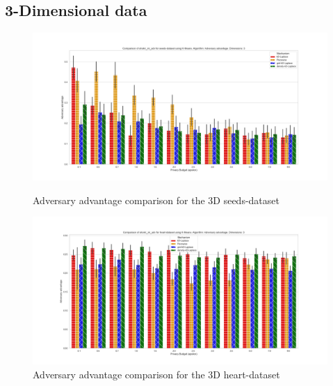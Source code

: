 {\begin{figure}[H]
    \end{figure}
    \subsection{3-Dimensional data}
    \begin{figure}[H]
        \centering
        \begin{minipage}[c]{0.8\textwidth}
            \includegraphics[width=1\textwidth]{Results/RQ2/seeds-dataset/shokri_mi_adv_seeds-dataset_comparison.png}
            \caption{Adversary advantage comparison for the 3D seeds-dataset}
            \label{fig:appendix-mi_seeds-dataset_comparison_3 d}
        \end{minipage}
        \begin{minipage}[c]{0.8\textwidth}
            \includegraphics[width=1\textwidth]{Results/RQ2/heart-dataset/shokri_mi_adv_heart-dataset_comparison.png}
            \caption{Adversary advantage comparison for the 3D heart-dataset}
            \label{fig:appendix-mi_heart-dataset_comparison_3d}
        \end{minipage}

    \end{figure}
}
